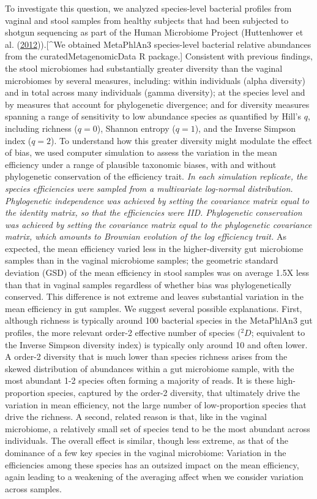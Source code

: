 \documentclass[
]{article}
\begin{document}
To investigate this question, we analyzed species-level bacterial profiles from vaginal and stool samples from healthy subjects that had been subjected to shotgun sequencing as part of the Human Microbiome Project (Huttenhower et al. (\protect\hyperlink{ref-huttenhower2012stru}{2012})).{[}\^{}We obtained MetaPhlAn3 species-level bacterial relative abundances from the curatedMetagenomicData R package.{]}
Consistent with previous findings, the stool microbiomes had substantially greater diversity than the vaginal microbiomes by several measures, including: within individuals (alpha diversity) and in total across many individuals (gamma diversity); at the species level and by measures that account for phylogenetic divergence; and for diversity measures spanning a range of sensitivity to low abundance species as quantified by Hill's \(q\), including richness (\(q=0\)), Shannon entropy (\(q=1\)), and the Inverse Simpson index (\(q=2\)).
To understand how this greater diversity might modulate the effect of bias, we used computer simulation to assess the variation in the mean efficiency under a range of plausible taxonomic biases, with and without phylogenetic conservation of the efficiency trait.
\emph{In each simulation replicate, the species efficiencies were sampled from a multivariate log-normal distribution.
Phylogenetic independence was achieved by setting the covariance matrix equal to the identity matrix, so that the efficiencies were IID.
Phylogenetic conservation was achieved by setting the covariance matrix equal to the phylogenetic covariance matrix, which amounts to Brownian evolution of the log efficiency trait.}
As expected, the mean efficiency varied less in the higher-diversity gut microbiome samples than in the vaginal microbiome samples; the geometric standard deviation (GSD) of the mean efficiency in stool samples was on average 1.5X less than that in vaginal samples regardless of whether bias was phylogenetically conserved.
This difference is not extreme and leaves substantial variation in the mean efficiency in gut samples.
We suggest several possible explanations.
First, although richness is typically around 100 bacterial species in the MetaPhlAn3 gut profiles, the more relevant order-2 effective number of species (\(^2D\); equivalent to the Inverse Simpson diversity index) is typically only around 10 and often lower.
A order-2 diversity that is much lower than species richness arises from the skewed distribution of abundances within a gut microbiome sample, with the most abundant 1-2 species often forming a majority of reads.
It is these high-proportion species, captured by the order-2 diversity, that ultimately drive the variation in mean efficiency, not the large number of low-proportion species that drive the richness.
A second, related reason is that, like in the vaginal microbiome, a relatively small set of species tend to be the most abundant across individuals.
The overall effect is similar, though less extreme, as that of the dominance of a few key species in the vaginal microbiome: Variation in the efficiencies among these species has an outsized impact on the mean efficiency, again leading to a weakening of the averaging affect when we consider variation across samples.
\end{document}
